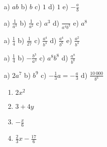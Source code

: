 \begin{Vastaus}{30}
a) $ab$ \qquad b) $b$ \qquad c) $1$ \qquad d) $1$ \qquad e) $-\frac{a}{b}$
\end{Vastaus}
\begin{Vastaus}{31}
a) $\frac{1}{a^3}$ \qquad b) $\frac{1}{a^2}$ \qquad c) $a^3$ \qquad d) $\frac{}{a^4b^3}$ \qquad e) $a^8$
\end{Vastaus}
\begin{Vastaus}{32}
a) $\frac{1}{4}$ \qquad b) $\frac{1}{27}$ \qquad c) $\frac{a^4}{b^4}$ \qquad d) $\frac{a^4}{b^6}$ \qquad e) $\frac{a^2}{b^4}$
\end{Vastaus}
\begin{Vastaus}{33}
a) $\frac{1}{4}$ \qquad b) $-\frac{b^3}{a^3}$ \qquad c) $a^8b^8$ \qquad d) $\frac{a^8}{b^8}$
\end{Vastaus}
\begin{Vastaus}{34}
a) $2a^7$ \qquad b) $b^9$ \qquad c) $-\frac{1}{3}a = -\frac{a}{3}$ \qquad d) $\frac{10\ 000}{b^6}$
\end{Vastaus}
\begin{Vastaus}{35}
\begin{enumerate}
\item $2x^2$
\item $3+4y$
\item $ -\frac{x}{6}$
\item $ \frac{2}{3} x - \frac{17}{6}$
\end{enumerate}
\end{Vastaus}
